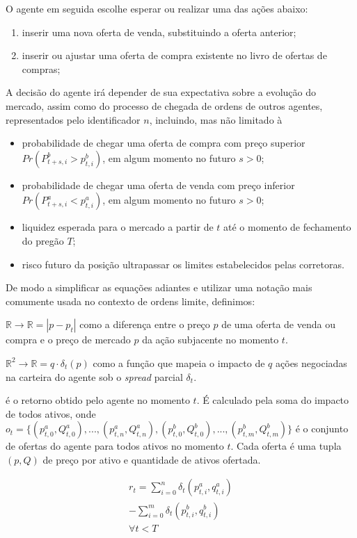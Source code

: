 O agente em seguida escolhe esperar ou realizar uma das ações abaixo:
\begin{enumerate}
    \item inserir uma nova oferta de venda, substituindo a oferta anterior;
    \item inserir ou ajustar uma oferta de compra existente no livro de ofertas de compras;
\end{enumerate}

A decisão do agente irá depender de sua expectativa sobre a evolução do mercado, assim como do processo de chegada de ordens de outros agentes, representados pelo identificador $n$, incluindo, mas não limitado à
\begin{itemize}
    \item probabilidade de chegar uma oferta de compra com preço superior $Pr(P_{t + s, i}^{b} > p_{t, i}^{b})$, em algum momento no futuro $s > 0$;
    \item probabilidade de chegar uma oferta de venda com preço inferior $Pr(P_{t + s, i}^{a} < p_{t, i}^{a})$, em algum momento no futuro $s > 0$;
    \item liquidez esperada para o mercado a partir de $t$ até o momento de fechamento do pregão $T$;
    \item risco futuro da posição ultrapassar os limites estabelecidos pelas corretoras.
\end{itemize}

De modo a simplificar as equações adiantes e utilizar uma notação mais comumente usada no contexto de ordens limite, definimos:

\begin{description}[]
	\item[$\delta_{t}(p)$:] $\mathbb{R} \rightarrow \mathbb{R} = |p - p_{t}|$ como a diferença entre o preço $p$ de uma oferta de venda ou compra e o preço de mercado $p$ da ação subjacente no momento $t$.
	
	\item[$\delta_{t}(p, q)$:] $\mathbb{R}^{2} \rightarrow \mathbb{R} = q \cdot \delta_{t}(p)$ como a função que mapeia o impacto de $q$ ações negociadas na carteira do agente sob o \textit{spread} parcial $\delta_t$.
	
	\item[$r_{t}$] é o retorno obtido pelo agente no momento $t$. É calculado pela soma do impacto de todos ativos, onde $o_{t} = \{(p_{t, 0}^{a}, Q_{t, 0}^{a}), ..., (p_{t, n}^{a}, Q_{t, n}^{a}), (p_{t, 0}^{b}, Q_{t, 0}^{b}), ..., (p_{t, m}^{b}, Q_{t, m}^{b})\}$ é o conjunto de ofertas do agente para todos ativos no momento $t$. Cada oferta é uma tupla $(p, Q)$ de preço por ativo e quantidade de ativos ofertada.
	
	\begin{equation} \label{return}
		\begin{aligned}
			r_{t} = \sum_{i = 0}^{n} \delta_{t}(p_{t, i}^{a}, q_{t, i}^{a}) \\
			-\sum_{i = 0}^{m} \delta_{t}(p_{t, i}^{b}, q_{t, i}^{b}) \\
			\forall t < T
		\end{aligned}
	\end{equation}
\end{description}

